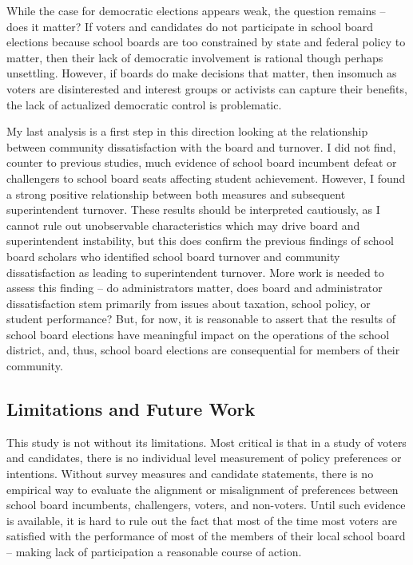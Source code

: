 While the case for democratic elections appears weak, the question remains -- does it 
matter? If voters and candidates do not participate in school board elections because 
school boards are too constrained by state and federal policy to matter, then their 
lack of democratic involvement is rational though perhaps unsettling. However, if boards do 
make decisions that matter, then insomuch as voters are disinterested and interest 
groups or activists can capture their benefits, the lack of actualized democratic 
control is problematic. 

My last analysis is a first step in this direction looking at the relationship between 
community dissatisfaction with the board and turnover. I did not find, counter to previous 
studies, much evidence of school board incumbent defeat or challengers to school board 
seats affecting student achievement. However, I found a strong positive relationship between 
both measures and subsequent superintendent turnover. These results should be interpreted 
cautiously, as I cannot rule out unobservable characteristics which may drive board and 
superintendent instability, but this does confirm the previous findings of school board 
scholars who identified school board turnover and community dissatisfaction as leading to 
superintendent turnover. More work is needed to assess this finding -- do administrators matter, does board and administrator dissatisfaction stem primarily from issues about taxation, school policy, or student performance? 
But, for now, it is reasonable to assert that the results of school board elections have 
meaningful impact on the operations of the school district, and, thus, school board elections are consequential for members of their community. 

\subsection{Limitations and Future Work}

This study is not without its limitations. Most critical is that in a study of 
voters and candidates, there is no individual level measurement of policy preferences 
or intentions. Without survey measures and candidate statements, there is no empirical 
way to evaluate the alignment or misalignment of preferences between school 
board incumbents, challengers, voters, and non-voters. Until such evidence is 
available, it is hard to rule out the fact that most of the time most voters are 
satisfied with the performance of most of the members of their local school 
board -- making lack of participation a reasonable course of action. 

